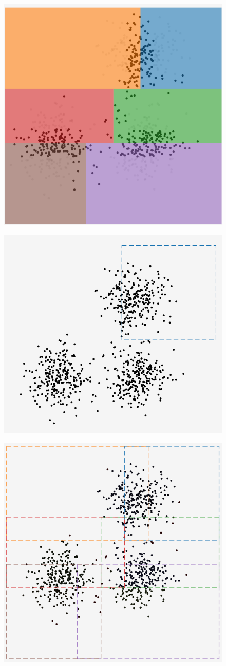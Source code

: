 \begin{figure}
	\centering
	\begin{minipage}{.5\textwidth}
		\centering
		\includegraphics[width=.6\linewidth]{images/db1_c.png}
		\label{fig:db1_c}
	\end{minipage}%
	\begin{minipage}{.5\textwidth}
		\centering
		\includegraphics[width=.6\linewidth]{images/db2_c.png}
		\label{fig:db2_c}
	\end{minipage}
	\begin{minipage}{.5\textwidth}
		\centering
		\includegraphics[width=.6\linewidth]{images/db3_c.png}

\end{minipage}
\end{figure}
